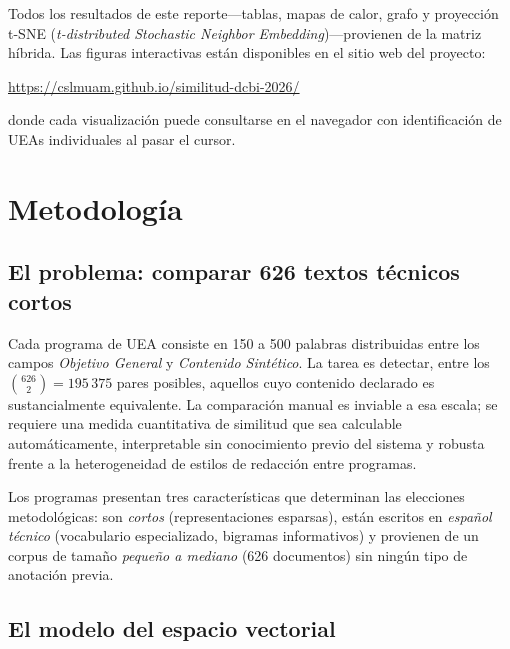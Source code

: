 \documentclass[11pt,a4paper]{article}
\begin{document}
Todos los resultados de este reporte---tablas, mapas de calor, grafo y proyección t-SNE (\textit{t-distributed Stochastic Neighbor Embedding})---provienen de la matriz híbrida.
Las figuras interactivas están disponibles en el sitio web del proyecto:
\begin{center}
  \url{https://cslmuam.github.io/similitud-dcbi-2026/}
\end{center}
donde cada visualización puede consultarse en el navegador con identificación de UEAs individuales al pasar el cursor.

\section{Metodología}

\subsection{El problema: comparar 626 textos técnicos cortos}

Cada programa de UEA consiste en 150 a 500 palabras distribuidas entre los campos \textit{Objetivo General} y \textit{Contenido Sintético}.
La tarea es detectar, entre los $\binom{626}{2} = 195\,375$ pares posibles, aquellos cuyo contenido declarado es sustancialmente equivalente.
La comparación manual es inviable a esa escala; se requiere una medida cuantitativa de similitud que sea calculable automáticamente, interpretable sin conocimiento previo del sistema y robusta frente a la heterogeneidad de estilos de redacción entre programas.

Los programas presentan tres características que determinan las elecciones metodológicas: son \textit{cortos} (representaciones esparsas), están escritos en \textit{español técnico} (vocabulario especializado, bigramas informativos) y provienen de un corpus de tamaño \textit{pequeño a mediano} (626 documentos) sin ningún tipo de anotación previa.

\subsection{El modelo del espacio vectorial}
\end{document}
